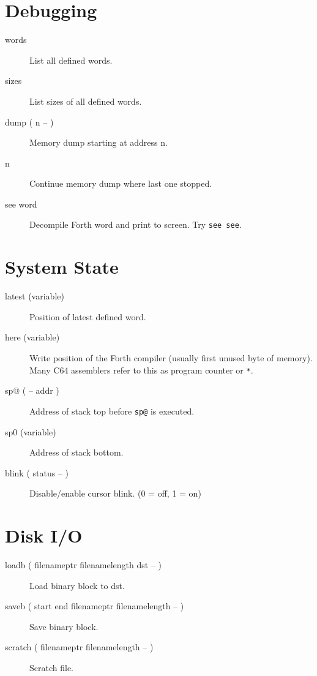 \section{Debugging}

\begin{description}
\item[words] List all defined words.
\item[sizes] List sizes of all defined words.
\item[dump ( n -- )] Memory dump starting at address n.
\item[n] Continue memory dump where last one stopped.
\item[see word] Decompile Forth word and print to screen. Try \texttt{see see}.
\end{description}


\section{System State}

\begin{description}

\item[latest (variable)] Position of latest defined word.

\item[here (variable)] Write position of the Forth compiler (usually first unused byte of memory). Many C64 assemblers refer to this as program counter or \texttt{*}.

\item[sp@ ( -- addr )] Address of stack top before \texttt{sp@} is executed.
\item[sp0 (variable)] Address of stack bottom.
\item[blink ( status -- )] Disable/enable cursor blink. (0 = off, 1 = on)

\end{description}


\section{Disk I/O}

\begin{description}
\item[loadb ( filenameptr filenamelength dst -- )] Load binary block to dst.
\item[saveb ( start end filenameptr filenamelength -- )] Save binary block.
\item[scratch ( filenameptr filenamelength -- )] Scratch file.
\end{description}


